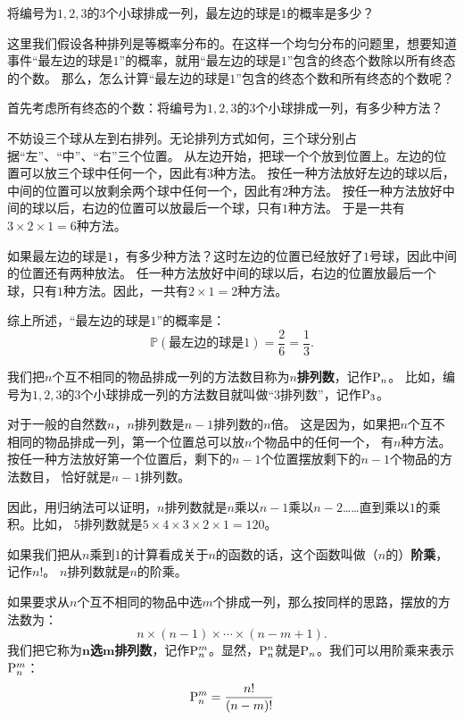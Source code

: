 \documentclass[12pt,UTF8]{ctexbook}
\begin{document}
\begin{ex}
    将编号为$1,2,3$的$3$个小球排成一列，最左边的球是$1$的概率是多少？
\end{ex}
这里我们假设各种排列是等概率分布的。在这样一个均匀分布的问题里，想要知道事件“最左边的球是$1$”的概率，就用“最左边的球是$1$”包含的终态个数除以所有终态的个数。
那么，怎么计算“最左边的球是$1$”包含的终态个数和所有终态的个数呢？

首先考虑所有终态的个数：将编号为$1,2,3$的$3$个小球排成一列，有多少种方法？

不妨设三个球从左到右排列。无论排列方式如何，三个球分别占据“左”、“中”、“右”三个位置。
从左边开始，把球一个个放到位置上。左边的位置可以放三个球中任何一个，因此有$3$种方法。
按任一种方法放好左边的球以后，中间的位置可以放剩余两个球中任何一个，因此有$2$种方法。
按任一种方法放好中间的球以后，右边的位置可以放最后一个球，只有$1$种方法。
于是一共有$3\times 2\times 1 = 6$种方法。

如果最左边的球是$1$，有多少种方法？这时左边的位置已经放好了$1$号球，因此中间的位置还有两种放法。
任一种方法放好中间的球以后，右边的位置放最后一个球，只有$1$种方法。因此，一共有$2\times 1 = 2$种方法。

综上所述，“最左边的球是$1$”的概率是：
$$ \mathbb{P}(\mbox{最左边的球是}1) = \frac{2}{6} = \frac{1}{3}. $$

我们把$n$个互不相同的物品排成一列的方法数目称为$n$\textbf{排列数}，记作$\pilo{n}$。
比如，编号为$1,2,3$的$3$个小球排成一列的方法数目就叫做“$3$排列数”，记作$\pilo{3}$。

对于一般的自然数$n$，$n$排列数是$n-1$排列数的$n$倍。
这是因为，如果把$n$个互不相同的物品排成一列，第一个位置总可以放$n$个物品中的任何一个，
有$n$种方法。按任一种方法放好第一个位置后，剩下的$n-1$个位置摆放剩下的$n-1$个物品的方法数目，
恰好就是$n-1$排列数。

因此，用归纳法可以证明，$n$排列数就是$n$乘以$n-1$乘以$n-2$……直到乘以$1$的乘积。比如，
$5$排列数就是$5\times 4\times 3\times 2\times 1 = 120$。

如果我们把从$n$乘到$1$的计算看成关于$n$的函数的话，这个函数叫做（$n$的）\textbf{阶乘}，记作$n!$。
$n$排列数就是$n$的阶乘。

如果要求从$n$个互不相同的物品中选$m$个排成一列，那么按同样的思路，摆放的方法数为：
$$ n \times (n - 1) \times \cdots \times (n - m + 1).$$
我们把它称为$\boldsymbol{n}$\textbf{选}$\boldsymbol{m}$\textbf{排列数}，记作$\pilo{n}[m]$。显然，$\pilo{n}[n]$就是$\pilo{n}$。我们可以用阶乘来表示$\pilo{n}[m]$：
$$\pilo{n}[m] = \frac{n!}{(n - m)!}$$
\end{document}
